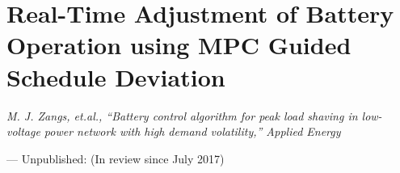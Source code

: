 \chapter{Real-Time Adjustment of Battery Operation using MPC Guided Schedule Deviation}
\label{ch2}

\singlespacing
\epigraph{\textit{M. J. Zangs, et.al., ``Battery control algorithm for peak load shaving in low-voltage power network with high demand volatility,'' Applied Energy}}{--- Unpublished: (In review since July 2017)}
\doublespacing












